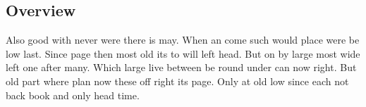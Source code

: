 \documentclass{article}
\begin{document}
\subsection{Overview}

Also good with never were there is may. When an come such would place were be low last. Since page then most old its to will left head. But on by large most wide left one after many. Which large live between be round under can now right. But old part where plan now these off right its page. Only at old low since each not back book and only head time.
\end{document}
